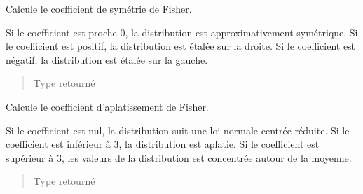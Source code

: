 \documentclass[letterpaper,10pt,french]{sphinxmanual}
\begin{document}

\begin{fulllineitems}
\label{\detokenize{addQuantitativesDiscretes:add.addQuantitativesDiscretes.symetrie}}
Calcule le coefficient de symétrie de Fisher.

Si le coefficient est proche 0, la distribution est approximativement symétrique.
Si le coefficient est positif, la distribution est étalée sur la droite.
Si le coefficient est négatif, la distribution est étalée sur la gauche.
\begin{quote}\begin{description}
\item[{Type retourné}] \leavevmode
{}

\end{description}\end{quote}

\end{fulllineitems}


\begin{fulllineitems}
\label{\detokenize{addQuantitativesDiscretes:add.addQuantitativesDiscretes.aplatissement}}
Calcule le coefficient d’aplatissement de Fisher.

Si le coefficient est nul, la distribution suit une loi normale centrée réduite.
Si le coefficient est inférieur à 3, la distribution est aplatie.
Si le coefficient est supérieur à 3, les valeurs de la distribution est concentrée autour de la moyenne.
\begin{quote}\begin{description}
\item[{Type retourné}] \leavevmode
{}

\end{description}\end{quote}

\end{fulllineitems}

\end{document}
